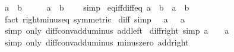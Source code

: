 \begin{isabellebody}
\ {\isachardoublequoteopen}a\ {\isacharequal}{\kern0pt}\ b{\isachardoublequoteclose}\isanewline
\ \ \isamarkupfalse%
\ \isamarkupfalse%
\ {\isachardoublequoteopen}a\ {\isacharminus}{\kern0pt}\ b\ {\isacharequal}{\kern0pt}\ {}{\isachardoublequoteclose}\ \isamarkupfalse%
\ simp\isanewline
{}\isamarkupfalse%
%
\endisatagproof
{\isafoldproof}%
%
\isadelimproof
\isanewline
%
\endisadelimproof
\isanewline
{}\isamarkupfalse%
\ eq{\isacharunderscore}{\kern0pt}iff{\isacharunderscore}{\kern0pt}diff{\isacharunderscore}{\kern0pt}eq{\isacharunderscore}{\kern0pt}{}{\isacharcolon}{\kern0pt}\ {\isachardoublequoteopen}a\ {\isacharequal}{\kern0pt}\ b\ {\isasymlongleftrightarrow}\ a\ {\isacharminus}{\kern0pt}\ b\ {\isacharequal}{\kern0pt}\ {}{\isachardoublequoteclose}\isanewline
%
\isadelimproof
\ \ %
\endisadelimproof
%
\isatagproof
{}\isamarkupfalse%
\ {\isacharparenleft}{\kern0pt}fact\ right{\isacharunderscore}{\kern0pt}minus{\isacharunderscore}{\kern0pt}eq\ {\isacharbrackleft}{\kern0pt}symmetric{\isacharbrackright}{\kern0pt}{\isacharparenright}{\kern0pt}%
\endisatagproof
{\isafoldproof}%
%
\isadelimproof
\isanewline
%
\endisadelimproof
\isanewline
{}\isamarkupfalse%
\ diff{\isacharunderscore}{\kern0pt}{}\ {\isacharbrackleft}{\kern0pt}simp{\isacharbrackright}{\kern0pt}{\isacharcolon}{\kern0pt}\ {\isachardoublequoteopen}{}\ {\isacharminus}{\kern0pt}\ a\ {\isacharequal}{\kern0pt}\ {\isacharminus}{\kern0pt}\ a{\isachardoublequoteclose}\isanewline
%
\isadelimproof
\ \ %
\endisadelimproof
%
\isatagproof
{}\isamarkupfalse%
\ {\isacharparenleft}{\kern0pt}simp\ only{\isacharcolon}{\kern0pt}\ diff{\isacharunderscore}{\kern0pt}conv{\isacharunderscore}{\kern0pt}add{\isacharunderscore}{\kern0pt}uminus\ add{\isacharunderscore}{\kern0pt}{}{\isacharunderscore}{\kern0pt}left{\isacharparenright}{\kern0pt}%
\endisatagproof
{\isafoldproof}%
%
\isadelimproof
\isanewline
%
\endisadelimproof
\isanewline
{}\isamarkupfalse%
\ diff{\isacharunderscore}{\kern0pt}{}{\isacharunderscore}{\kern0pt}right\ {\isacharbrackleft}{\kern0pt}simp{\isacharbrackright}{\kern0pt}{\isacharcolon}{\kern0pt}\ {\isachardoublequoteopen}a\ {\isacharminus}{\kern0pt}\ {}\ {\isacharequal}{\kern0pt}\ a{\isachardoublequoteclose}\isanewline
%
\isadelimproof
\ \ %
\endisadelimproof
%
\isatagproof
{}\isamarkupfalse%
\ {\isacharparenleft}{\kern0pt}simp\ only{\isacharcolon}{\kern0pt}\ diff{\isacharunderscore}{\kern0pt}conv{\isacharunderscore}{\kern0pt}add{\isacharunderscore}{\kern0pt}uminus\ minus{\isacharunderscore}{\kern0pt}zero\ add{\isacharunderscore}{\kern0pt}{}{\isacharunderscore}{\kern0pt}right{\isacharparenright}{\kern0pt}%

\end{isabellebody}
